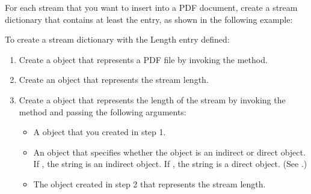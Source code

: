 \documentclass[letterpaper,12pt,english,openany,oneside]{sphinxmanual}
\begin{document}
For each stream that you want to insert into a PDF document, create a stream dictionary that contains at least the  entry, as shown in the following example:

\begin{sphinxVerbatim}[commandchars=\\\{\}]
 
\end{sphinxVerbatim}

To create a stream dictionary with the Length entry defined:
\begin{enumerate}
%
\item {} 
Create a  object that represents a PDF file by invoking the  method.

\item {} 
Create an  object that represents the stream length.

\item {} 
Create a  object that represents the length of the stream by invoking the  method and passing the following arguments:
\begin{itemize}
\item {} 
A  object that you created in step 1.

\item {} 
An  object that specifies whether the  object is an indirect or direct object. If , the string is an indirect object. If , the string is a direct object. (See .)

\item {} 
The  object created in step 2 that represents the stream length.

\end{itemize}

\end{enumerate}
\end{document}
